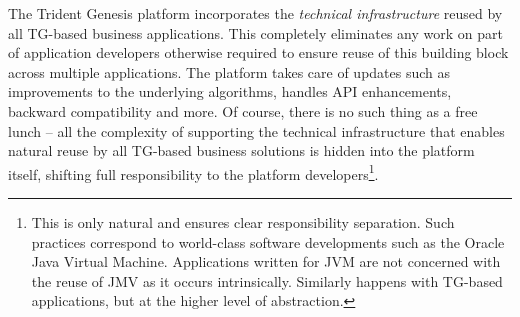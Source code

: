   The Trident Genesis platform incorporates the \emph{technical infrastructure} reused by all TG-based business applications.
  This completely eliminates any work on part of application developers otherwise required to ensure reuse of this building block across multiple applications.
  The platform takes care of updates such as improvements to the underlying algorithms, handles API enhancements, backward compatibility and more.
  Of course, there is no such thing as a free lunch -- all the complexity of supporting the technical infrastructure that enables natural reuse by all TG-based business solutions is hidden into the platform itself, shifting full responsibility to the platform developers\footnote{This is only natural and ensures clear responsibility separation. Such practices correspond to world-class software developments such as the Oracle Java Virtual Machine. 
  Applications written for JVM are not concerned with the reuse of JMV as it occurs intrinsically. Similarly happens with TG-based applications, but at the higher level of abstraction.}.

